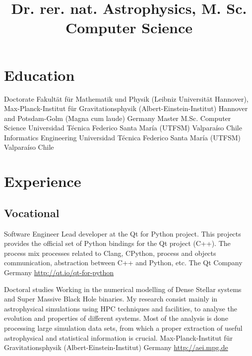 \documentclass[12pt,a4paper]{moderncv}
\title{\large Dr. rer. nat. Astrophysics,\newline
M. Sc. Computer Science}
\newcommand{\utfsm}{Universidad Técnica Federico Santa María (UTFSM)}
\newcommand{\gray}{\textcolor{gray}}
\newcommand{\myurl}[1]{\gray{\url{#1}}}
\newcommand{\aei}{Max-Planck-Institut für Gravitationsphysik (Albert-Einstein-Institut)}
\newcommand{\qt}{The Qt Company}
\newcommand{\cc}{\textcolor{color1}}
\begin{document}
\maketitle

\section{\LARGE Education}

\cventry{\cc{\textbf{2013 to\\ 2018}}}
        {Doctorate}
        {Fakultät für Mathematik und Physik (Leibniz Universität Hannover), \aei}
        {Hannover and Potsdam-Golm}
        {(Magna cum laude)}
        {Germany}
        {Master}
        {M.Sc. Computer Science}
        {{\utfsm}}
        {Valparaíso}
        {Chile}
        {Informatics Engineering}
        {}
        {{\utfsm}}
        {Valparaíso}
        {Chile}

\section{\LARGE Experience}
\subsection{\Large Vocational}
\vspace{0.3cm}

        {Software Engineer}
        {Lead developer at the \cc{Qt for Python} project.
        This projects provides the official set of Python bindings
        for the Qt project (C++). The process mix processes related
        to Clang, CPython, process and objects communication,
        abstraction between C++ and Python, etc.}
        {\qt}
        {Germany}
        {\myurl{http://qt.io/qt-for-python}}


        {Doctoral studies}
        {Working in the numerical modelling of \cc{Dense Stellar systems}
        and \cc{Super Massive Black Hole} binaries.\newline
        My research consist mainly in astrophysical simulations using \cc{HPC}
        techniques and facilities, to analyse the evolution and properties
        of different systems.\newline
        Most of the \cc{analysis} is done processing large simulation data sets,
        from which a proper extraction of useful astrophysical and statistical
        information is crucial.
        }
        {\aei}
        {Germany}
        {\myurl{http://aei.mpg.de}}
\end{document}
